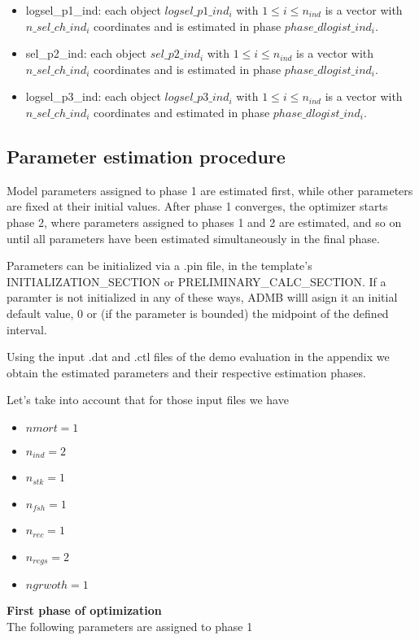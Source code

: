 \documentclass{article}
\begin{document}
\begin{itemize}
    \item logsel\_p1\_ind: each object $logsel\_p1\_ind_i$ with $1\leq i \leq n_{ind}$ is a vector with $n\_sel\_ch\_ind_i$ coordinates and is estimated in phase $phase\_dlogist\_ind_i$.

    
    \item sel\_p2\_ind: each object $sel\_p2\_ind_i$  with $1\leq i \leq n_{ind}$ is a vector with $n\_sel\_ch\_ind_i$ coordinates and is estimated in phase $phase\_dlogist\_ind_i$.
    
    \item logsel\_p3\_ind: each object $logsel\_p3\_ind_i$ with $1\leq  i \leq n_{ind}$ is a vector with $n\_sel\_ch\_ind_i$ coordinates and estimated in phase $phase\_dlogist\_ind_i$.
\end{itemize}


\subsection{Parameter estimation procedure}
Model parameters assigned to phase 1 are estimated first, while other parameters are fixed at their initial values.  After phase 1 converges, the optimizer starts phase 2, where parameters assigned to phases 1 and  2 are estimated, and so on until all parameters have been estimated simultaneously in the final phase.

Parameters can be initialized via a .pin file, in the template's INITIALIZATION\_SECTION or PRELIMINARY\_CALC\_SECTION. If a paramter is not initialized in any of these ways, ADMB willl asign it an initial default value, 0 or (if  the  parameter is bounded) the midpoint of the defined interval. 

Using the input .dat and .ctl files of the demo evaluation in the appendix we obtain the estimated parameters and their respective estimation phases.

Let's take into account that for those input files we have
\begin{itemize}
    \item $nmort=1$
    \item $n_{ind}=2$
    \item $n_{stk}=1$
    \item $n_{fsh}=1$
    \item $n_{rec}=1$
    \item $n_{regs}=2$
    \item $ngrwoth=1$
\end{itemize}
\textbf{First phase of optimization}\\
The following parameters are assigned to phase 1
\end{document}
